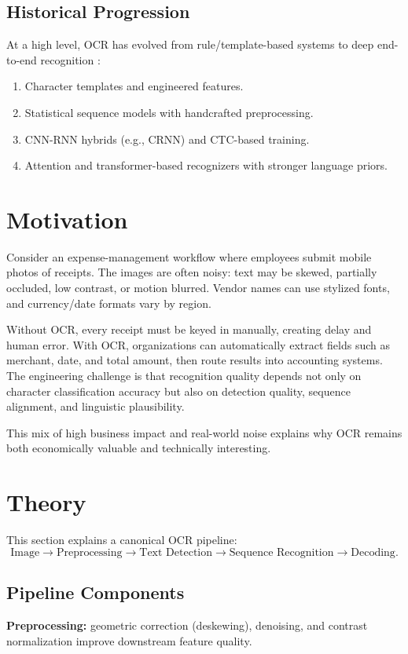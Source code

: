 \documentclass[11pt]{article}
\begin{document}
\subsection{Historical Progression}
At a high level, OCR has evolved from rule/template-based systems to deep end-to-end recognition \cite{mori1999ocrsurvey,smith2007tesseract,shi2016crnn,baek2019str}:
\begin{enumerate}[leftmargin=*]
    \item Character templates and engineered features.
    \item Statistical sequence models with handcrafted preprocessing.
    \item CNN-RNN hybrids (e.g., CRNN) and CTC-based training.
    \item Attention and transformer-based recognizers with stronger language priors.
\end{enumerate}

\section{Motivation}
Consider an expense-management workflow where employees submit mobile photos of receipts. The images are often noisy: text may be skewed, partially occluded, low contrast, or motion blurred. Vendor names can use stylized fonts, and currency/date formats vary by region.

Without OCR, every receipt must be keyed in manually, creating delay and human error. With OCR, organizations can automatically extract fields such as merchant, date, and total amount, then route results into accounting systems. The engineering challenge is that recognition quality depends not only on character classification accuracy but also on detection quality, sequence alignment, and linguistic plausibility.

This mix of high business impact and real-world noise explains why OCR remains both economically valuable and technically interesting.

\section{Theory}
This section explains a canonical OCR pipeline:
\[
\text{Image} \rightarrow \text{Preprocessing} \rightarrow \text{Text Detection} \rightarrow \text{Sequence Recognition} \rightarrow \text{Decoding}.
\]

\subsection{Pipeline Components}
\textbf{Preprocessing:} geometric correction (deskewing), denoising, and contrast normalization improve downstream feature quality.
\end{document}
